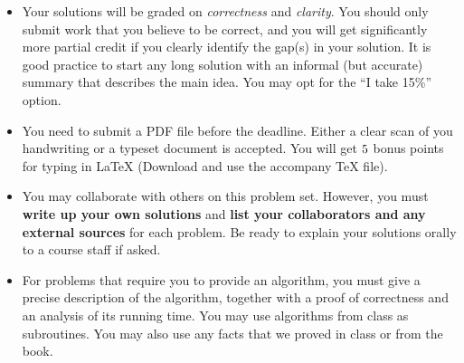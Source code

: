 \begin{itemize}
\item Your solutions will be graded on \emph{correctness} and
  \emph{clarity}. You should only submit work that you believe to be
  correct, and you will get significantly more partial credit if you
  clearly identify the gap(s) in your solution. It is good practice to
  start any long solution with an informal (but accurate) summary that
  describes the main idea. You may opt for the ``I take 15\%'' option.

\item You need to submit a PDF file before the deadline. Either a
  clear scan of you handwriting or a typeset document is accepted. You
  will get $5$ bonus points for typing in LaTeX (Download and use
  the accompany TeX file).

\item You may collaborate with others on this problem set. However,
  you must \textbf{{write up your own solutions}} and \textbf{{list
      your collaborators and any external sources}} for each
  problem. Be ready to explain your solutions orally to a course staff
  if asked.

\item For problems that require you to provide an algorithm, you must
  give a precise description of the algorithm, together with a proof
  of correctness and an analysis of its running time. You may use
  algorithms from class as subroutines. You may also use any facts
  that we proved in class or from the book.

\end{itemize}

\newpage


